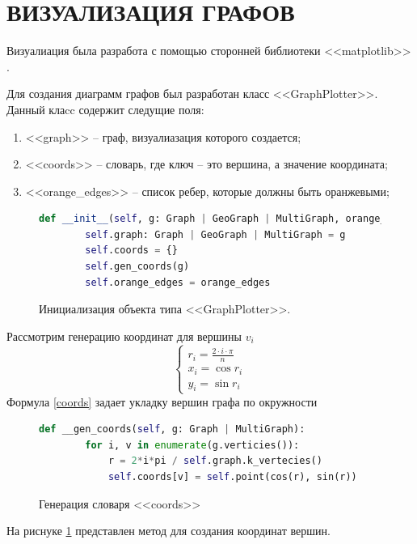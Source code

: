 \section{ВИЗУАЛИЗАЦИЯ ГРАФОВ}
Визуалиация была разработа с помощью
сторонней библиотеки <<matplotlib>> \cite{plt}.

Для создания диаграмм графов был разработан класс
<<GraphPlotter>>. Данный клаcc содержит следущие поля:
\begin{enumerate}
    \item  <<graph>> -- граф, визуалиазация которого создается;
    \item <<coords>> -- словарь, где ключ -- это вершина, а значение
        координата;
    \item <<orange\_edges>> -- список ребер, которые 
        должны быть оранжевыми;
\end{enumerate}
\begin{figure}[H] 
\begin{lstlisting}[language=Python] 
    def __init__(self, g: Graph | GeoGraph | MultiGraph, orange_edges=[]):
        self.graph: Graph | GeoGraph | MultiGraph = g
        self.coords = {}
        self.gen_coords(g)
        self.orange_edges = orange_edges
\end{lstlisting}  
    \caption{Инициализация объекта типа <<GraphPlotter>>.}
\end{figure} 
Рассмотрим генерацию координат для 
вершины $v_{i}$
\begin{equation}
\begin{cases}
    r_{i} = \frac{2 \cdot i \cdot \pi }{n} \\
    x_{i} =  \cos{r_{i}}\\
    y_{i} = \sin{r_{i}}
\end{cases}
\label{coords}
\end{equation} 
Формула \ref{coords} задает укладку
вершин графа по окружности
\begin{figure}[H] 
\begin{lstlisting}[language=Python] 
    def __gen_coords(self, g: Graph | MultiGraph):
        for i, v in enumerate(g.verticies()):
            r = 2*i*pi / self.graph.k_vertecies()
            self.coords[v] = self.point(cos(r), sin(r))
\end{lstlisting}  
    \caption{Генерация словаря <<coords>>}
    \label{gcoors}
\end{figure} 
На риснуке \ref{gcoors} представлен метод для создания
координат вершин.
